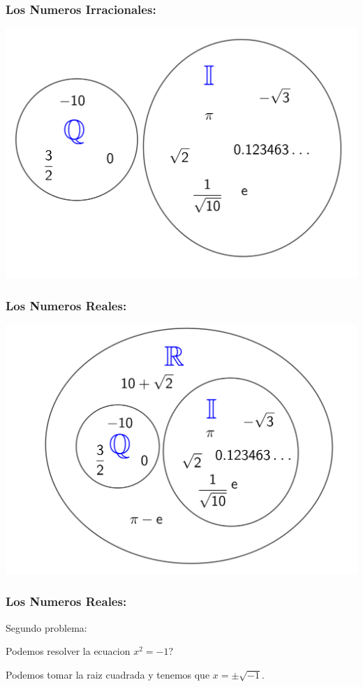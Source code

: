 \documentclass{beamer}
\theoremstyle{thmstyle}
\theoremstyle{thmstyle}
\theoremstyle{thmstyle}
\theoremstyle{mystyle}
\theoremstyle{qstnstyle}
\begin{document}
\begin{frame}
\frametitle{Los Numeros Irracionales:}
\begin{center}
\includegraphics[width=0.8\linewidth]{Image5.png}
\end{center}
\end{frame}

\begin{frame}
\frametitle{Los Numeros Reales:}
\begin{center}
\includegraphics[width=0.8\linewidth]{Image6.png}
\end{center}
\end{frame}

\begin{frame}
\frametitle{Los Numeros Reales:}
{\huge{
Segundo problema: }}
\vspace{10mm}
\begin{itemize}


\Large{
\item Podemos resolver la ecuacion $x^2=-1?$}
\end{itemize}

\pause
\vspace{5mm}
Podemos tomar la raiz cuadrada y tenemos que $x=\pm\sqrt{-1}$.

\end{frame}
\end{document}
